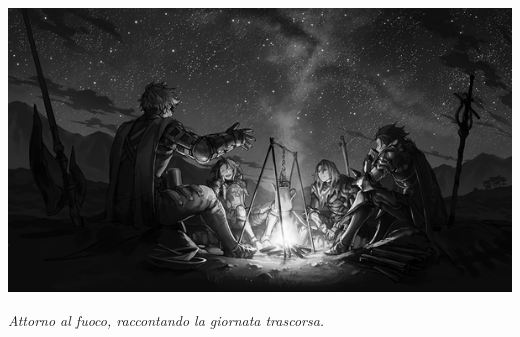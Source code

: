 \begin{multicols}{2}

\end{multicols}




\vfill

\begin{center}

\includegraphics[width=0.9\linewidth]{immagini/Granblue.Fantasy.full.2108782.png}


\emph{Attorno al fuoco, raccontando la giornata trascorsa.}
\end{center}


